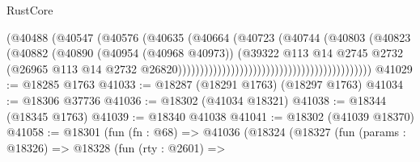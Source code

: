 \begin{lexlean}{RustCore}
\begin{coremodule}
                                                                  (@40488
                                                                    (@40547
                                                                      (@40576
                                                                        (@40635
                                                                          (@40664
                                                                            (@40723
                                                                              (@40744
                                                                                (@40803
                                                                                  (@40823
                                                                                    (@40882
                                                                                      (@40890
                                                                                        (@40954
                                                                                          (@40968
                                                                                            @40973))
                                                                                        (@39322
                                                                                          @113
                                                                                          @14
                                                                                          @2745
                                                                                          @2732
                                                                                          (@26965
                                                                                            @113
                                                                                            @14
                                                                                            @2732
                                                                                            @26820))))))))))))))))))))))))))))))))))))))))))))
@41029 := @18285 @1763
@41033 := @18287 (@18291 @1763) (@18297 @1763)
@41034 := @18306 @37736
@41036 := @18302 (@41034 @18321)
@41038 := @18344 (@18345 @1763)
@41039 := @18340 @41038
@41041 := @18302 (@41039 @18370)
@41058 := @18301
    (fun (fn : @68) =>
    @41036
      (@18324
        (@18327
          (fun (params : @18326) =>
          @18328
            (fun (rty : @2601) =>

\end{coremodule}
\end{lexlean}
